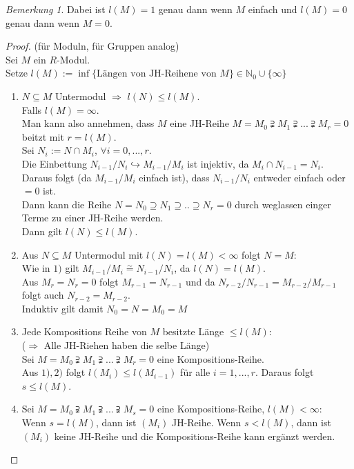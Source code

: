 \documentclass[10pt,a4paper]{article}
\newcommand{\N}{\ensuremath{\mathbb{N}}}
\newcommand{\isomorph}{\ensuremath{\overset{\sim}{=}}}
\theoremstyle{definition}
\theoremstyle{plain}
\theoremstyle{remark}
\newtheorem*{bem*}{Bemerkung}
\begin{document}
\begin{bem*}
	Dabei ist $l(M)=1$ genau dann wenn $M$ einfach und $l(M)=0$ genau dann wenn $M=0$.
\end{bem*}

\begin{proof}
	(für Moduln, für Gruppen analog)\\
	Sei $M$ ein $R$-Modul.\\
	Setze $l(M):=\inf\{\text{Längen von JH-Reihene von $M$}\}\in \N_0\cup\{\infty\}$
	\begin{enumerate}
		\item $N\subseteq M$ Untermodul $\Rightarrow$ $l(N)\leq l(M)$.\\
		Falls $l(M)=\infty$.\\
		Man kann also annehmen, dass $M$ eine JH-Reihe $M=M_0\supsetneqq M_1\supsetneqq...\supsetneqq M_r=0$ beitzt mit $r=l(M)$.\\
		Sei $N_i:=N\cap M_i$, $\forall i=0,...,r$.\\
		Die Einbettung $N_{i-1}/N_i\hookrightarrow M_{i-1}/M_i$ ist injektiv, da $M_i\cap N_{i-1}=N_i$.\\
		Daraus folgt (da $M_{i-1}/M_i$ einfach ist), dass $N_{i-1}/N_i$ entweder einfach oder $=0$ ist.\\
		Dann kann die Reihe $N=N_0\supseteq N_1\supseteq..\supseteq N_r=0$ durch weglassen einger Terme zu einer JH-Reihe werden.\\
		Dann gilt $l(N)\leq l(M)$.
		
		\item Aus $N\subseteq M$ Untermodul mit $l(N)=l(M)<\infty$ folgt $N=M$:\\
		Wie in $1)$ gilt $M_{i-1}/M_i\isomorph N_{i-1}/N_i$, da $l(N)=l(M)$.\\
		Aus $M_r=N_r=0$ folgt $M_{r-1}=N_{r-1}$ und da $N_{r-2}/N_{r-1}=M_{r-2}/M_{r-1}$ folgt auch $N_{r-2}=M_{r-2}$.\\
		Induktiv gilt damit $N_0=N=M_0=M$
		\item Jede Kompositions Reihe von $M$ besitzte Länge $\leq l(M)$:\\
		($\Rightarrow$ Alle JH-Riehen haben die selbe Länge)\\
		Sei $M=M_0\supsetneqq M_1\supsetneqq...\supsetneqq M_r=0$ eine Kompositions-Reihe.\\
		Aus $1),2)$ folgt $l(M_i)\leq l(M_{i-1})$ für alle $i=1,...,r$. Daraus folgt $s\leq l(M)$.
		
		\item Sei $M=M_0\supsetneqq M_1\supsetneqq...\supsetneqq M_s=0$ eine Kompositions-Reihe, $l(M)<\infty$:\\
		Wenn $s=l(M)$, dann ist $(M_i)$ JH-Reihe. Wenn $s<l(M)$, dann ist $(M_i)$ keine JH-Reihe und die Kompositions-Reihe kann ergänzt werden.
	\end{enumerate}
\end{proof}
\end{document}

